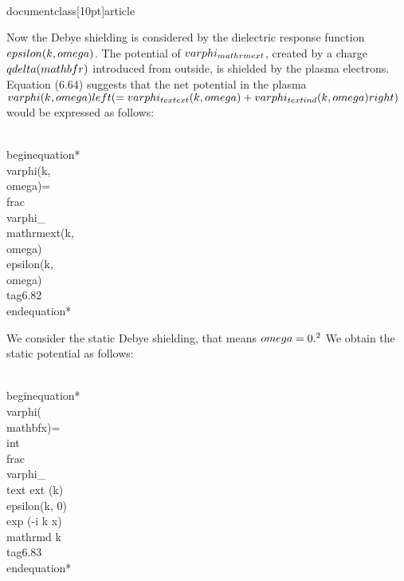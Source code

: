 \\documentclass[10pt]{article}
\begin{document}
{{{{Now the Debye shielding is considered by the dielectric response function $\\epsilon(k, \\omega)$. The potential of $\\varphi_{\\mathrm{ext}}$, created by a charge $q \\delta(\\mathbf{r})$ introduced from outside, is shielded by the plasma electrons. Equation (6.64) suggests that the net potential in the plasma $\\varphi(k, \\omega)\\left(=\\varphi_{\\text {ext }}(k, \\omega)+\\varphi_{\\text {ind }}(k, \\omega)\\right)$ would be expressed as follows:


\\begin{equation*}
\\varphi(k, \\omega)=\\frac{\\varphi_{\\mathrm{ext}}(k, \\omega)}{\\epsilon(k, \\omega)} \\tag{6.82}
\\end{equation*}


We consider the static Debye shielding, that means $\\omega=0 .^{2}$ We obtain the static potential as follows:


\\begin{equation*}
\\varphi(\\mathbf{x})=\\int \\frac{\\varphi_{\\text {ext }}(k)}{\\epsilon(k, 0)} \\exp (-i k x) \\mathrm{d} k \\tag{6.83}
\\end{equation*}


}}}}
\end{document}
